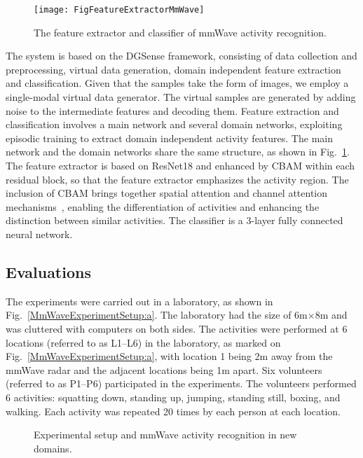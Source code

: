 \documentclass[journal]{IEEEtran}
\begin{document}
\begin{figure}
\begin{center}
\texttt{[image: FigFeatureExtractorMmWave]}
\caption{The feature extractor and classifier of mmWave activity recognition.}
\label{mmWaveSystem}
\end{center}
\end{figure}

The system is based on the DGSense framework, consisting of data collection and preprocessing, virtual data generation, domain independent feature extraction and classification. Given that the samples take the form of images, we employ a single-modal virtual data generator. The virtual samples are generated by adding noise to the intermediate features and decoding them. Feature extraction and classification involves a main network and several domain networks, exploiting episodic training to extract domain independent activity features. The main network and the domain networks share the same structure, as shown in Fig.~\ref{mmWaveSystem}. The feature extractor is based on ResNet18 and enhanced by CBAM within each residual block, so that the feature extractor emphasizes the activity region. The inclusion of CBAM brings together spatial attention and channel attention mechanisms~\cite{Woo:2018}, enabling the differentiation of activities and enhancing the distinction between similar activities. The classifier is a 3-layer fully connected neural network.  

\subsection{Evaluations}
The experiments were carried out in a laboratory, as shown in Fig.~\ref{MmWaveExperimentSetup:a}. The laboratory had the size of 6m$\times$8m and was cluttered with computers on both sides. The activities were performed at 6 locations (referred to as L1--L6) in the laboratory, as marked on Fig.~\ref{MmWaveExperimentSetup:a}, with location 1 being 2m away from the mmWave radar and the adjacent locations being 1m apart. Six volunteers (referred to as P1--P6) participated in the experiments. The volunteers performed 6 activities: squatting down, standing up, jumping, standing still, boxing, and walking. Each activity was repeated 20 times by each person at each location. 

\begin{figure*}
\begin{center}
\hspace{0.5cm}
\hspace{0.5cm}
\caption{Experimental setup and mmWave activity recognition in new domains.}
\label{MmwaveActivityResults}
\end{center}
\end{figure*}
\end{document}

